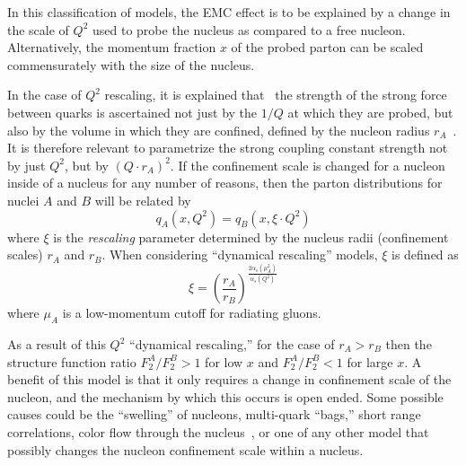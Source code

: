 In this classification of models, the EMC effect is to be explained by a change in the scale of $Q^2$ used to probe the nucleus as compared to a free nucleon. Alternatively, the momentum fraction $x$ of the probed parton can be scaled commensurately with the size of the nucleus.

In the case of $Q^2$ rescaling, it is explained that~\cite{Rith:2014tma} the strength of the strong force between quarks is ascertained not just by the $1/Q$ at which they are probed, but also by the volume in which they are confined, defined by the nucleon radius $r_A$~\cite{Close:1983tn, Nachtmann:1983py}.  It is therefore relevant to parametrize the strong coupling constant strength not by just $Q^2$, but by $(Q\cdot r_A)^2$.  If the confinement scale is changed for a nucleon inside of a nucleus for any number of reasons, then the parton distributions for nuclei $A$ and $B$ will be related by
\begin{equation}
q_A(x,Q^2) = q_B(x,\xi\cdot Q^2)
\end{equation}
where $\xi$ is the \emph{rescaling} parameter determined by the nucleus radii (confinement scales) $r_A$ and $r_B$. When considering ``dynamical rescaling'' models, $\xi$ is defined as
\begin{equation}
\xi = \left(\frac{r_A}{r_B}\right)^{\frac{2\alpha_s (\mu_A^2)}{\alpha_s(Q^2)}}
\end{equation}
where $\mu_A$ is a low-momentum cutoff for radiating gluons.

As a result of this $Q^2$ ``dynamical rescaling,'' for the case of $r_A>r_B$ then the structure function ratio $F_2^A/F_2^B>1$ for low $x$ and $F_2^A/F_2^B<1$ for large $x$. A benefit of this model is that it only requires a change in confinement scale of the nucleon, and the mechanism by which this occurs is open ended. Some possible causes could be the ``swelling'' of nucleons, multi-quark ``bags,'' short range correlations, color flow through the nucleus~\cite{Rith:2014tma}, or one of any other model that possibly changes the nucleon confinement scale within a nucleus.

